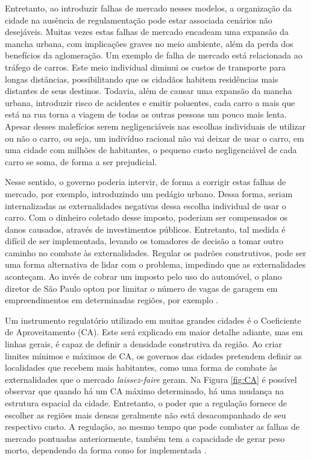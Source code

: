 Entretanto, ao introduzir falhas de mercado nesses modelos, a organização da cidade na ausência de regulamentação pode estar associada cenários não desejáveis. Muitas vezes estas falhas de mercado encadeam uma expansão da mancha urbana, com implicações graves no meio ambiente, além da perda dos benefícios da aglomeração. Um exemplo de falha de mercado está relacionada ao tráfego de carros. Este meio individual diminui os custos de transporte para longas distâncias, possibilitando que os cidadãos habitem residências mais distantes de seus destinos. Todavia, além de causar uma expansão da mancha urbana, introduzir risco de acidentes e emitir poluentes, cada carro a mais que está na rua torna a viagem de todas as outras pessoas um pouco mais lenta. Apesar desses malefícios serem negligenciáveis nas escolhas individuais de utilizar ou não o carro, ou seja, um indivíduo racional não vai deixar de usar o carro, em uma cidade com milhões de habitantes, o pequeno custo negligenciável de cada carro se soma, de forma a ser prejudicial.

Nesse sentido, o governo poderia intervir, de forma a corrigir estas falhas de mercado, por exemplo, introduzindo um pedágio urbano. Dessa forma, seriam internalizadas as externalidades negativas dessa escolha individual de usar o carro. Com o dinheiro coletado desse imposto, poderiam ser compensados os danos causados, através de investimentos públicos. Entretanto, tal medida é difícil de ser implementada, levando os tomadores de decisão a tomar outro caminho no combate às externalidades. Regular os padrões construtivos, pode ser uma forma alternativa de lidar com o problema, impedindo que as externalidades aconteçam. Ao invés de cobrar um imposto pelo uso do automóvel, o plano diretor de São Paulo optou por limitar o número de vagas de garagem em empreendimentos em determinadas regiões, por exemplo \cite{PDE}.

Um instrumento regulatório utilizado em muitas grandes cidades é o Coeficiente de Aproveitamento (CA). Este será explicado em maior detalhe adiante, mas em linhas gerais, é capaz de definir a densidade construtiva da região. Ao criar limites mínimos e máximos de CA, os governos das cidades pretendem definir as localidades que recebem mais habitantes, como uma forma de combate às externalidades que o mercado \textit{laissez-faire} geram. Na Figura \ref{fig:CA} é possível observar que quando há um CA máximo determinado, há uma mudança na estrutura espacial da cidade. Entretanto, o poder que a regulação fornece de escolher as regiões mais densas geralmente não está desacompanhado de seu respectivo custo. A regulação, ao mesmo tempo que pode combater as falhas de mercado pontuadas anteriormente, também tem a capacidade de gerar peso morto, dependendo da forma como for implementada \cite{brueckner2011lectures}.

